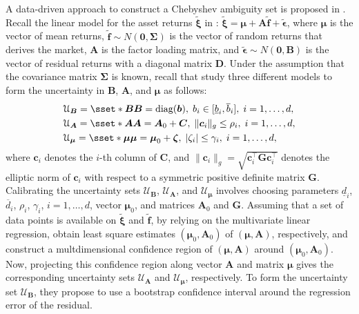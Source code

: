 \documentclass[final,onefignum,onetabnum]{class}
\newcommand{\bs}[1]{\boldsymbol{#1}} %
\newcommand{\Cs}[1]{\mathcal{#1}} %
\newcommand{\txi}{\tilde{\bs{\xi}}}
\newcommand{\tbs}[1]{\tilde{\bs{#1}}}
\newcommand{\ul}[1]{\underline{#1}}
\newcommand{\ol}[1]{\overline{#1}}
\begin{document}
A data-driven approach to construct a Chebyshev ambiguity set is proposed in \citet{goldfarb2003}. Recall the linear model for  the asset returns $\txi$ in \citet{goldfarb2003}: $\txi=\bs{\mu} + \bs{A} \tbs{f} + \tbs{\epsilon}$, where $\bs{\mu}$ is the vector of mean returns, $\tbs{f} \sim N(\bs{0}, \bs{\Sigma})$ is the vector of random returns that derives the market, $\bs{A}$ is the factor loading matrix, and $\tbs{\epsilon} \sim N(\bs{0}, \bs{B})$ is the vector of residual returns with a diagonal matrix $\bs{D}$. 
Under the assumption that the covariance matrix $\bs{\Sigma}$ is known, recall that \citet{goldfarb2003} study three different models to form the uncertainty in $\bs{B}$, $\bs{A}$, and $\bs{\mu}$ as follows:
\begin{align*}
    & \Cs{U}_{\bs{B}}=\sset*{\bs{B}}{\bs{B}=\text{diag}(\bs{b}), \; b_{i} \in [\ul{b}_{i}, \ol{b}_{i}], \; i=1, \ldots, d},\\
    & \Cs{U}_{\bs{A}}=\sset*{\bs{A}}{\bs{A}=\bs{A}_{0}+ \bs{C}, \; \|\bs{c}_{i}\|_{g} \le \rho_{i}, \; i=1, \ldots, d},\\
    & \Cs{U}_{\bs{\mu}}=\sset*{\bs{\mu}}{\bs{\mu}=\bs{\mu}_{0}+ \bs{\zeta}, \; |\zeta_{i}| \le \gamma_{i}, \; i=1, \ldots, d},
\end{align*}
where $\bs{c}_{i}$ denotes the $i$-th column of $\bs{C}$, and $\|\bs{c}_{i}\|_{g}=\sqrt{\bs{c}_{i}^{\top} \bs{G} \bs{c}_{i}^{\top}}$ denotes the elliptic norm of $\bs{c}_{i}$ with respect to a symmetric positive definite matrix $\bs{G}$. 
Calibrating the uncertainty sets $\Cs{U}_{\bs{B}}$, $\Cs{U}_{\bs{A}}$, and $\Cs{U}_{\bs{\mu}}$ involves choosing parameters $\ul{d}_{i}$, $\ol{d}_{i}$, $\rho_{i}$, $\gamma_{i}$, $i=1, \ldots, d$, vector $\bs{\mu}_{0}$, and matrices $\bs{A}_{0}$ and $\bs{G}$. 
Assuming that a set of data points is available on $\txi$ and $\tbs{f}$, by relying on the multivariate linear regression, \citet{goldfarb2003} obtain  least square estimates $(\bs{\mu}_{0},\bs{A}_{0})$ of $(\bs{\mu},\bs{A})$, respectively, and construct a multdimensional  confidence region of  $(\bs{\mu},\bs{A})$ around  $(\bs{\mu}_{0},\bs{A}_{0})$. Now, projecting this confidence region along vector $\bs{A}$ and matrix $\bs{\mu}$ gives the corresponding uncertainty sets $\Cs{U}_{\bs{A}}$ and $\Cs{U}_{\bs{\mu}}$, respectively. To form the uncertainty set $\Cs{U}_{\bs{B}}$, they propose to use a bootstrap confidence interval around the regression error of the residual. 
\end{document}
